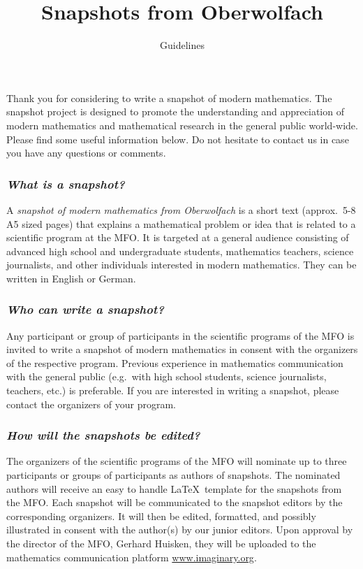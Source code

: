 \documentclass[a4paper,12pt]{article}
\title{Snapshots from Oberwolfach}
\date{}
\author{Guidelines}
\begin{document}
\maketitle
\thispagestyle{fancy}
\afterpage{\chead{\thepage}}

Thank you for considering to write a snapshot of modern mathematics. The snapshot project is designed to promote the understanding and appreciation of modern mathematics and mathematical research in the general public world-wide. Please find some useful information below. Do not hesitate to contact us in case you have any questions or comments.

\subsubsection*{\it What is a snapshot?}
A {\it snapshot of modern mathematics from Oberwolfach} is a short text (approx.\ 5-8 A5 sized pages) that explains a mathematical problem or idea that is related to a scientific program at the MFO. It is targeted at a general audience consisting of advanced high school and undergraduate students, mathematics teachers, science journalists, and other individuals interested in modern mathematics. They can be written in English or German. 

\subsubsection*{\it Who can write a snapshot?}
Any participant or group of participants in the scientific programs of the MFO is invited to write a snapshot of modern mathematics in consent with the organizers of the respective program. Previous experience in mathematics communication with the general public (e.g.~with high school students, science journalists, teachers, etc.) is preferable. If you are interested in writing a snapshot, please contact the organizers of your program.

\subsubsection*{\it How will the snapshots be edited?}
The organizers of the scientific programs of the MFO will nominate up to three participants or groups of participants as authors of snapshots. The nominated authors will receive an easy to handle \LaTeX~template for the snapshots from the MFO. Each snapshot will be communicated to the snapshot editors by the corresponding organizers. It will then be edited, formatted, and possibly illustrated in consent with the author(s) by our junior editors. Upon approval by the director of the MFO, Gerhard Huisken, they will be uploaded to the mathematics communication platform \url{www.imaginary.org}.
\end{document}
